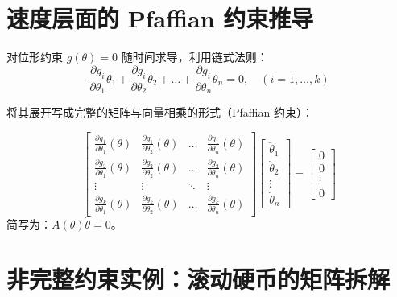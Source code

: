 \section{速度层面的 Pfaffian 约束推导}

对位形约束 $g(\theta) = 0$ 随时间求导，利用链式法则：
\begin{equation}
    \frac{\partial g_i}{\partial \theta_1}\dot{\theta}_1 + \frac{\partial g_i}{\partial \theta_2}\dot{\theta}_2 + \dots + \frac{\partial g_i}{\partial \theta_n}\dot{\theta}_n = 0, \quad (i=1, \dots, k)
\end{equation}

将其展开写成完整的矩阵与向量相乘的形式（Pfaffian 约束）：
\begin{tcolorbox}[colback=orange!5, colframe=orange!75!black, title=速度约束展开形式]
\begin{equation}
\begin{bmatrix}
    \frac{\partial g_1}{\partial \theta_1}(\theta) & \frac{\partial g_1}{\partial \theta_2}(\theta) & \dots & \frac{\partial g_1}{\partial \theta_n}(\theta) \\
    \frac{\partial g_2}{\partial \theta_1}(\theta) & \frac{\partial g_2}{\partial \theta_2}(\theta) & \dots & \frac{\partial g_2}{\partial \theta_n}(\theta) \\
    \vdots & \vdots & \ddots & \vdots \\
    \frac{\partial g_k}{\partial \theta_1}(\theta) & \frac{\partial g_k}{\partial \theta_2}(\theta) & \dots & \frac{\partial g_k}{\partial \theta_n}(\theta)
\end{bmatrix}
\begin{bmatrix}
    \dot{\theta}_1 \\ \dot{\theta}_2 \\ \vdots \\ \dot{\theta}_n
\end{bmatrix}
=
\begin{bmatrix}
    0 \\ 0 \\ \vdots \\ 0
\end{bmatrix}
\end{equation}
简写为：$A(\theta)\dot{\theta} = 0$。
\end{tcolorbox}

\section{非完整约束实例：滚动硬币的矩阵拆解}

